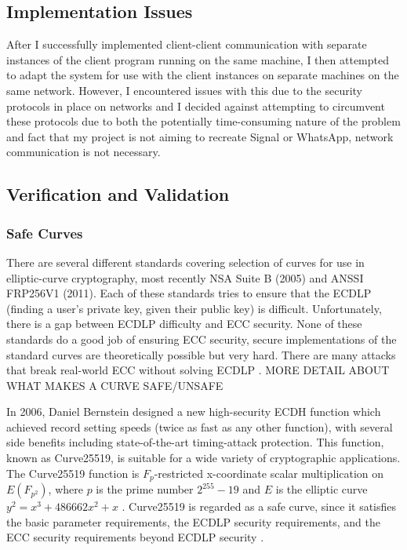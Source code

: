 \documentclass[12pt,a4paper]{article}
\begin{document}
\subsection{Implementation Issues} \label{Implementation}
After I successfully implemented client-client communication with separate instances of the client program running on the 
same machine, I then attempted to adapt the system for use with the client instances on separate machines on the same network. 
However, I encountered issues with this due to the security protocols in place on networks and I decided against attempting to 
circumvent these protocols due to both the potentially time-consuming nature of the problem and fact that my project is not aiming 
to recreate Signal or WhatsApp, network communication is not necessary. 


\subsection{Verification and Validation} \label{Verification}
\subsubsection{Safe Curves} \label{Safe Curves}
There are several different standards covering selection of curves for use in elliptic-curve cryptography, 
most recently NSA Suite B (2005) and ANSSI FRP256V1 (2011). 
Each of these standards tries to ensure that the ECDLP (finding a user's private key, given their public key) is difficult. 
Unfortunately, there is a gap between ECDLP difficulty and ECC security. 
None of these standards do a good job of ensuring ECC security, 
secure implementations of the standard curves are theoretically possible but very hard. 
There are many attacks that break real-world ECC without solving ECDLP \cite{bernstein2013safecurves}. 
MORE DETAIL ABOUT WHAT MAKES A CURVE SAFE/UNSAFE

In 2006, Daniel Bernstein designed a new high-security ECDH function which achieved record setting speeds (twice as fast as any other function), 
with several side benefits including state-of-the-art timing-attack protection. 
This function, known as Curve25519, is suitable for a wide variety of cryptographic applications. 
The Curve25519 function is $F_p$-restricted x-coordinate scalar multiplication on $E(F_{p^2})$, 
where $p$ is the prime number $2^{255} - 19$ and $E$ is the elliptic curve $y^2 = x^3 + 486662x^2 + x$ \cite{10.1007/11745853_14}.
Curve25519 is regarded as a safe curve, since it satisfies the basic parameter requirements, the ECDLP security requirements, 
and the ECC security requirements beyond ECDLP security \cite{bernstein2013safecurves}.
\end{document}
